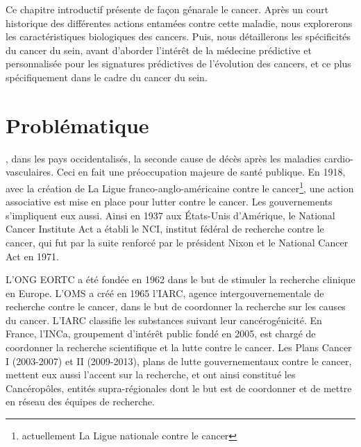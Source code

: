 \singlespacing

		\begin{center}
				\begin{tcolorbox}[colback=red!5!white,colframe=red!45!black,arc=0mm]

					\sffamily
						Ce chapitre introductif présente de façon génarale le cancer.
						Après un court historique des différentes actions entamées contre cette maladie, nous explorerons les caractéristiques biologiques des cancers.
						Puis, nous détaillerons les spécificités du cancer du sein, avant d'aborder l'intérêt de la médecine prédictive et personnalisée pour les signatures prédictives de l'évolution des cancers, et ce plus spécifiquement dans le cadre du cancer du sein.
					\end{tcolorbox}
					\vspace{5ex}
					\minitoc
		\end{center}
		\newpage

	\doublespacing

	\section{\textcolor{red!45!black}{Problématique}}\label{sec:Problématique}
		, dans les pays occidentalisés, la seconde cause de décès après les maladies cardio-vasculaires.
		Ceci en fait une préoccupation majeure de santé publique.
		En 1918, avec la création de La Ligue franco-anglo-américaine contre le cancer\footnote{actuellement La Ligue nationale contre le cancer}, une action associative est mise en place pour lutter contre le cancer.
		Les gouvernements s'impliquent eux aussi.
		Ainsi en 1937 aux États-Unis d'Amérique, le National Cancer Institute Act\citep{NCA1937} a établi le \ac{NCI}, institut fédéral de recherche contre le cancer, qui fut par la suite renforcé par le président Nixon et le National Cancer Act en 1971.

		L'\ac{ONG} \ac{EORTC} a été fondée en 1962 dans le but de stimuler la recherche clinique en Europe.
		L'\ac{OMS} a créé en 1965 l'\ac{IARC}, agence intergouvernementale de recherche contre le cancer, dans le but de coordonner la recherche sur les causes du cancer.
		L'\ac{IARC} classifie les substances suivant leur cancérogénicité.
		En France, l'\ac{INCa}, groupement d'intérêt public fondé en 2005, est chargé de coordonner la recherche scientifique et la lutte contre le cancer.
		Les Plans Cancer I (2003-2007) et II (2009-2013), plans de lutte gouvernementaux contre le cancer, mettent eux aussi l'accent sur la recherche, et ont ainsi constitué les Cancéropôles, entités supra-régionales dont le but est de coordonner et de mettre en réseau des équipes de recherche.
		
